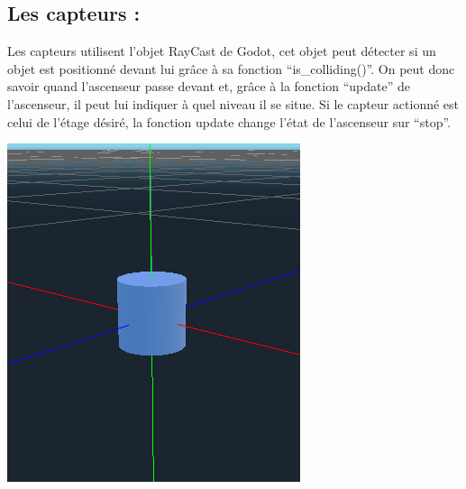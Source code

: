 \documentclass[12pt]{article}
\begin{document}
\subsection{Les capteurs :}
\newline
Les capteurs utilisent l’objet RayCast de Godot, cet objet peut détecter si un objet est positionné devant lui grâce à sa fonction “is\_colliding()”. On peut donc savoir quand l’ascenseur passe devant et, grâce à la fonction “update” de l’ascenseur, il peut lui indiquer à quel niveau il se situe. Si le capteur actionné est celui de l’étage désiré, la fonction update change l’état de l’ascenseur sur “stop”.
\newline
\begin{center}\includegraphics[scale=0.6]{capteur.PNG}\end{center}
\newline
\newline
\end{document}
